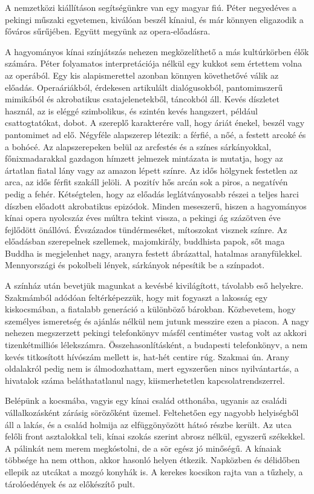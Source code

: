 A nemzetközi kiállításon segítségünkre van egy magyar fiú. Péter negyedéves
a pekingi műszaki egyetemen, kiválóan beszél kínaiul, és már könnyen
eligazodik a főváros sűrűjében. Együtt megyünk az opera-előadásra.

A hagyományos kínai színjátszás nehezen megközelíthető a más
kultúrkörben élők számára. Péter folyamatos interpretációja nélkül egy
kukkot sem értettem volna az operából. Egy kis alapismerettel azonban
könnyen követhetővé válik az előadás. Operaáriákból, érdekesen
artikulált dialógusokból, pantomimszerű mimikából és akrobatikus
csatajelenetekből, táncokból áll. Kevés díszletet használ, az is eléggé
szimbolikus, és szintén kevés hangszert, például csattogtatókat, dobot.
A szereplő karakterére vall, hogy áriát énekel, beszél vagy pantomimet
ad elő. Négyféle alapszerep létezik: a férfié, a nőé, a festett arcoké és
a bohócé. Az alapszerepeken belül az arcfestés és a színes sárkányokkal,
főnixmadarakkal gazdagon hímzett jelmezek mintázata is mutatja,
hogy az ártatlan fiatal lány vagy az amazon lépett színre. Az idős hölgynek
festetlen az arca, az idős férfit szakáll jelöli. A pozitív hős arcán sok
a piros, a negatívén pedig a fehér. Kétségtelen, hogy az előadás
leglátványosabb részei a teljes harci díszben előadott akrobatikus epizódok.
Minden meseszerű, hiszen a hagyományos kínai opera nyolcszáz éves
múltra tekint vissza, a pekingi ág százötven éve fejlődött önállóvá.
Évszázados tündérmeséket, mítoszokat visznek színre. Az előadásban
szerepelnek szellemek, majomkirály, buddhista papok, sőt maga Buddha
is megjelenhet nagy, aranyra festett ábrázattal, hatalmas aranyfülekkel.
Mennyországi és pokolbeli lények, sárkányok népesítik be a színpadot.

A színház után bevetjük magunkat a kevésbé kivilágított, távolabb eső
helyekre. Szakmámból adódóan feltérképezzük, hogy mit fogyaszt a lakosság
egy kiskocsmában, a fiatalabb generáció a különböző bárokban.
Közbevetem, hogy személyes ismeretség és ajánlás nélkül nem jutunk
messzire ezen a piacon. A nagy nehezen megszerzett pekingi telefonkönyv
másfél centiméter vastag volt az akkori tizenkétmilliós lélekszámra.
Összehasonlításként, a budapesti telefonkönyv, a nem kevés titkosított
hívószám mellett is, hat-hét centire rúg. Szakmai ún. Arany oldalakról pedig
nem is álmodozhattam, mert egyszerűen nincs nyilvántartás, a hivatalok
száma beláthatatlanul nagy, kiismerhetetlen kapcsolatrendszerrel.

Belépünk a kocsmába, vagyis egy kínai család otthonába, ugyanis
az családi vállalkozásként zárásig sörözőként üzemel. Feltehetően egy
nagyobb helyiségből áll a lakás, és a család holmija az elfüggönyözött
hátsó részbe került. Az utca felőli front asztalokkal teli, kínai szokás
szerint abrosz nélkül, egyszerű székekkel. A pálinkát nem merem
megkóstolni, de a sör egész jó minőségű. A kínaiak többsége ha nem
otthon, akkor hasonló helyen étkezik. Napközben és délidőben ellepik
az utcákat a mozgó konyhák is. A kerekes kocsikon rajta van a
tűzhely, a tárolóedények és az előkészítő pult.

